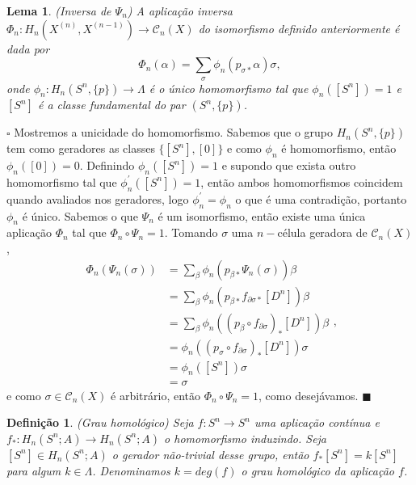 \documentclass[12pt]{book}
\newtheorem{lema}[teorema]{Lema}
\newtheorem{definicao}[teorema]{Definição}
\newenvironment{prova}[1]{$\square$ #1}{\hfill$\blacksquare$}
\newcommand{\homologia}[2]{H_{#1}(#2;A)}
\newcommand{\homologiarel}[3]{H_{#1}(#2,#3)}
\newcommand{\homologiarelskelesimpl}[2]{H_{#1}(X^{(#2)}, X^{(#2-1)})}
\begin{document}
	\begin{lema}
		(Inversa de $\Psi_{n}$) A aplicação inversa $\Phi_{n} : \homologiarelskelesimpl{n}{n} \to \mathcal{C}_{n}(X)$ do isomorfismo definido anteriormente é dada por
		$$
		\Phi_{n}(\alpha) = \sum_{\sigma} \phi_{n}(p_{\sigma *}\alpha)\sigma,
		$$
		onde $\phi_{n}: \homologiarel{n}{S^{n}}{\{p\}} \to \Lambda$ é o único homomorfismo tal que $\phi_{n}([S^{n}])=1$ e $[S^{n}]$ é a classe fundamental do par $(S^{n}, \{p\})$.
	\end{lema}
	\begin{prova}
		Mostremos a unicidade do homomorfismo. Sabemos que o grupo $\homologiarel{n}{S^{n}}{\{p\}}$ tem como geradores as classes $\{[S^{n}], [0]\}$ e como $\phi_{n}$ é homomorfismo, então $\phi_{n}([0]) = 0$. Definindo $\phi_{n}([S^{n}]) = 1$ e supondo que exista outro homomorfismo tal que $\phi_{n}^{'} ([S^{n}]) = 1$, então ambos homomorfismos coincidem quando avaliados nos geradores, logo $\phi_{n}^{'}=\phi_{n}$ o que é uma contradição, portanto $\phi_{n}$ é único. Sabemos o que $\Psi_{n}$ é um isomorfismo, então existe uma única aplicação $\Phi_{n}$ tal que $\Phi_{n} \circ \Psi_{n} = 1$. Tomando $\sigma$ uma $n-$célula geradora de $\mathcal{C}_{n}(X)$,
		$$
		\begin{aligned}
		\Phi_{n}(\Psi_{n}(\sigma)) 
		&= \sum_{\beta}\phi_{n}(p_{\beta *}\Psi_{n}(\sigma))\beta
		\\
		&= \sum_{\beta}\phi_{n}(p_{\beta *}f_{\partial\sigma *}[D^{n}])\beta
		\\
		&= \sum_{\beta}\phi_{n}((p_{\beta}\circ f_{\partial\sigma})_{*}[D^{n}])\beta
		\\
		&= \phi_{n}((p_{\sigma}\circ f_{\partial\sigma})_{*}[D^{n}])\sigma
		\\
		&= \phi_{n}([S^{n}])\sigma
		\\
		&= \sigma	
		\end{aligned},
		$$
		e como $\sigma \in \mathcal{C}_{n}(X)$ é arbitrário, então $\Phi_{n} \circ \Psi_{n} = 1$, como desejávamos.
	\end{prova}
	
	\begin{definicao}
		(Grau homológico) Seja $f: S^{n} \to S^{n}$ uma aplicação contínua e $f_{*}: \homologia{n}{S^{n}} \to \homologia{n}{S^{n}}$ o homomorfismo induzindo. Seja $[S^{n}] \in \homologia{n}{S^{n}}$ o gerador não-trivial desse grupo, então $f_{*}[S^{n}] = k[S^{n}]$ para algum $k \in \Lambda$. Denominamos $k=deg(f)$ o grau homológico da aplicação $f$.
	\end{definicao}
	
\end{document}
